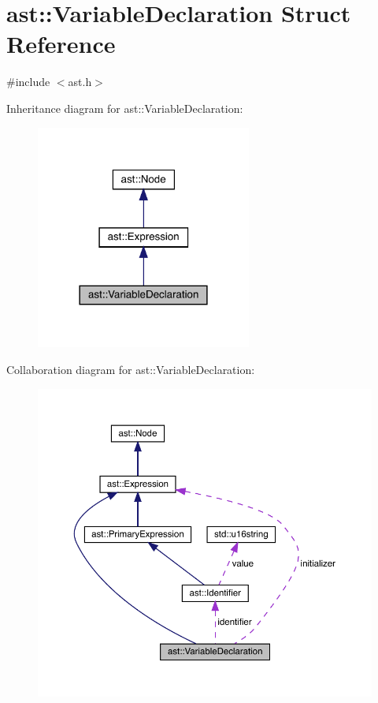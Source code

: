 \hypertarget{structast_1_1_variable_declaration}{}\section{ast\+:\+:Variable\+Declaration Struct Reference}
\label{structast_1_1_variable_declaration}


{\ttfamily \#include $<$ast.\+h$>$}



Inheritance diagram for ast\+:\+:Variable\+Declaration\+:\nopagebreak
\begin{figure}[H]
\begin{center}
\leavevmode
\includegraphics[width=201pt]{structast_1_1_variable_declaration__inherit__graph}
\end{center}
\end{figure}


Collaboration diagram for ast\+:\+:Variable\+Declaration\+:
\nopagebreak
\begin{figure}[H]
\begin{center}
\leavevmode
\includegraphics[width=350pt]{structast_1_1_variable_declaration__coll__graph}
\end{center}
\end{figure}
